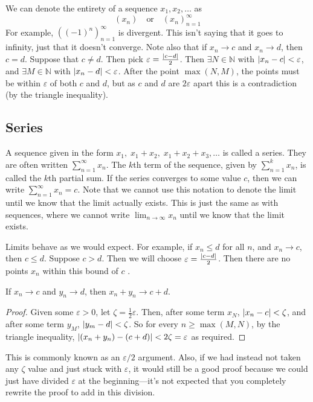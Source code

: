 We can denote the entirety of a sequence \(x_1, x_2, \dots\) as
\[(x_n) \quad \text{or} \quad (x_n)_{n=1}^\infty\]
For example, \(\left( (-1)^n \right)_{n=1}^{\infty}\) is divergent.
This isn't saying that it goes to infinity, just that it doesn't converge.
Note also that if \(x_n \to c\) and \(x_n \to d\), then \(c=d\).
Suppose that \(c \neq d\).
Then pick \(\varepsilon = \frac{\abs{c-d}}{2}\).
Then \(\exists N \in \mathbb N\) with \(\abs{x_n - c} < \varepsilon\), and \(\exists M \in \mathbb N\) with \(\abs{x_n - d} < \varepsilon\).
After the point \(\max(N, M)\), the points must be within \(\varepsilon\) of both \(c\) and \(d\), but as \(c\) and \(d\) are \(2\varepsilon\) apart this is a contradiction (by the triangle inequality).

\subsection{Series}
A sequence given in the form \(x_1,\; x_1 + x_2,\; x_1 + x_2 + x_3, \dots\) is called a series.
They are often written \(\sum_{n=1}^\infty x_n\).
The \(k\)th term of the sequence, given by \(\sum_{n=1}^k x_n\), is called the \(k\)th partial sum.
If the series converges to some value \(c\), then we can write \(\sum_{n=1}^\infty x_n = c\).
Note that we cannot use this notation to denote the limit until we know that the limit actually exists.
This is just the same as with sequences, where we cannot write \(\lim_{n\to\infty} x_n\) until we know that the limit exists.

Limits behave as we would expect.
For example, if \(x_n \leq d\) for all \(n\), and \(x_n \to c\), then \(c \leq d\).
Suppose \(c > d\).
Then we will choose \(\varepsilon = \frac{\abs{c - d}}{2}\).
Then there are no points \(x_n\) within this bound of \(c\) \contradiction.

\begin{proposition}
	If \(x_n \to c\) and \(y_n \to d\), then \(x_n + y_n \to c + d\).
\end{proposition}
\begin{proof}
	Given some \(\varepsilon > 0\), let \(\zeta = \frac{1}{2}\varepsilon\).
	Then, after some term \(x_N\), \(\abs{x_n - c} < \zeta\), and after some term \(y_M\), \(\abs{y_m - d} < \zeta\).
	So for every \(n \geq \max(M, N)\), by the triangle inequality, \(\abs{(x_n + y_n) - (c + d)} < 2\zeta = \varepsilon\) as required.
\end{proof}
This is commonly known as an \(\varepsilon/2\) argument.
Also, if we had instead not taken any \(\zeta\) value and just stuck with \(\varepsilon\), it would still be a good proof because we could just have divided \(\varepsilon\) at the beginning---it's not expected that you completely rewrite the proof to add in this division.


